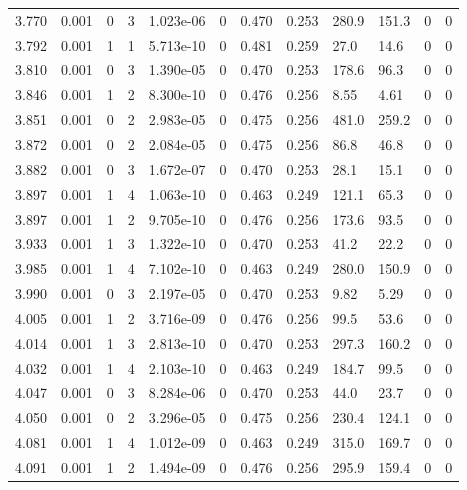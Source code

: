 \documentclass[preview]{standalone}
\begin{document}
{{{{{\begin{tabular}{L{1.2cm}C{1.2cm} C{0.3cm}C{0.5cm} C{1.4cm}C{1.4cm} C{1.4cm}C{1.4cm} C{1.6cm}C{1.6cm} C{1.6cm}C{1.6cm}}
  3.770  &  0.001  & 0     &  3 &  1.023e-06  & 0  &  0.470&   0.253& 280.9 & 151.3   &  0 & 0  \\ 
  3.792  &  0.001  & 1     &  1 &  5.713e-10  & 0  &  0.481&   0.259& 27.0 & 14.6   &  0 & 0  \\ 
  3.810  &  0.001  & 0     &  3 &  1.390e-05  & 0  &  0.470&   0.253& 178.6 & 96.3   &  0 & 0  \\ 
  3.846  &  0.001  & 1     &  2 &  8.300e-10  & 0  &  0.476&   0.256& 8.55 & 4.61   &  0 & 0  \\ 
  3.851  &  0.001  & 0     &  2 &  2.983e-05  & 0  &  0.475&   0.256& 481.0 & 259.2   &  0 & 0  \\ 
  3.872  &  0.001  & 0     &  2 &  2.084e-05  & 0  &  0.475&   0.256& 86.8 & 46.8   &  0 & 0  \\ 
  3.882  &  0.001  & 0     &  3 &  1.672e-07  & 0  &  0.470&   0.253& 28.1 & 15.1   &  0 & 0  \\ 
  3.897  &  0.001  & 1     &  4 &  1.063e-10  & 0  &  0.463&   0.249& 121.1 & 65.3   &  0 & 0  \\ 
  3.897  &  0.001  & 1     &  2 &  9.705e-10  & 0  &  0.476&   0.256& 173.6 & 93.5   &  0 & 0  \\ 
  3.933  &  0.001  & 1     &  3 &  1.322e-10  & 0  &  0.470&   0.253& 41.2 & 22.2   &  0 & 0  \\ 
  3.985  &  0.001  & 1     &  4 &  7.102e-10  & 0  &  0.463&   0.249& 280.0 & 150.9   &  0 & 0  \\ 
  3.990  &  0.001  & 0     &  3 &  2.197e-05  & 0  &  0.470&   0.253& 9.82 & 5.29   &  0 & 0  \\ 
  4.005  &  0.001  & 1     &  2 &  3.716e-09  & 0  &  0.476&   0.256& 99.5 & 53.6   &  0 & 0  \\ 
  4.014  &  0.001  & 1     &  3 &  2.813e-10  & 0  &  0.470&   0.253& 297.3 & 160.2   &  0 & 0  \\ 
  4.032  &  0.001  & 1     &  4 &  2.103e-10  & 0  &  0.463&   0.249& 184.7 & 99.5   &  0 & 0  \\ 
  4.047  &  0.001  & 0     &  3 &  8.284e-06  & 0  &  0.470&   0.253& 44.0 & 23.7   &  0 & 0  \\ 
  4.050  &  0.001  & 0     &  2 &  3.296e-05  & 0  &  0.475&   0.256& 230.4 & 124.1   &  0 & 0  \\ 
  4.081  &  0.001  & 1     &  4 &  1.012e-09  & 0  &  0.463&   0.249& 315.0 & 169.7   &  0 & 0  \\ 
  4.091  &  0.001  & 1     &  2 &  1.494e-09  & 0  &  0.476&   0.256& 295.9 & 159.4   &  0 & 0  \\ 

\end{tabular}}}}}}
\end{document}
